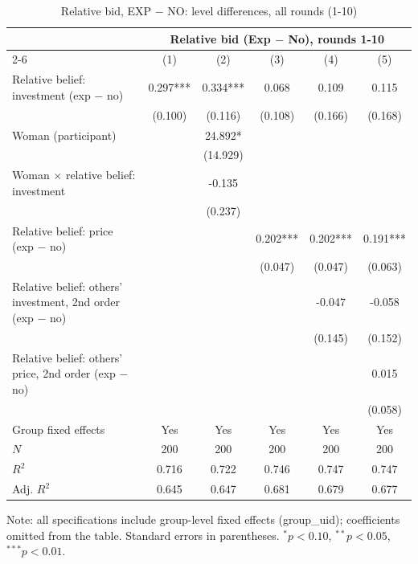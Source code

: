 \begin{table}[!htbp]
  \centering
  \caption{Relative bid, EXP $-$ NO: level differences, all rounds (1-10)}
  \begin{tabular}{l*{5}{c}}
    \toprule
     & \multicolumn{5}{c}{Relative bid (Exp $-$ No), rounds 1-10} \\
    \cmidrule(lr){2-6}
     & (1) & (2) & (3) & (4) & (5) \\
    \midrule
Relative belief: investment (exp $-$ no) & 0.297*** & 0.334*** & 0.068 & 0.109 & 0.115 \\
 & (0.100) & (0.116) & (0.108) & (0.166) & (0.168) \\
Woman (participant) &  & 24.892* &  &  &  \\
 &  & (14.929) &  &  &  \\
Woman $\times$ relative belief: investment &  & -0.135 &  &  &  \\
 &  & (0.237) &  &  &  \\
Relative belief: price (exp $-$ no) &  &  & 0.202*** & 0.202*** & 0.191*** \\
 &  &  & (0.047) & (0.047) & (0.063) \\
Relative belief: others' investment, 2nd order (exp $-$ no) &  &  &  & -0.047 & -0.058 \\
 &  &  &  & (0.145) & (0.152) \\
Relative belief: others' price, 2nd order (exp $-$ no) &  &  &  &  & 0.015 \\
 &  &  &  &  & (0.058) \\
    \midrule
    Group fixed effects & Yes & Yes & Yes & Yes & Yes \\
    $N$ & 200 & 200 & 200 & 200 & 200 \\
    $R^2$ & 0.716 & 0.722 & 0.746 & 0.747 & 0.747 \\
    Adj. $R^2$ & 0.645 & 0.647 & 0.681 & 0.679 & 0.677 \\
    \bottomrule
  \end{tabular}
  \begin{tablenotes}
  \footnotesize
  \item Note: all specifications include group-level fixed effects (group\_uid); coefficients omitted from the table. Standard errors in parentheses. $^{*}p<0.10$, $^{**}p<0.05$, $^{***}p<0.01$.
  \end{tablenotes}
\end{table}
